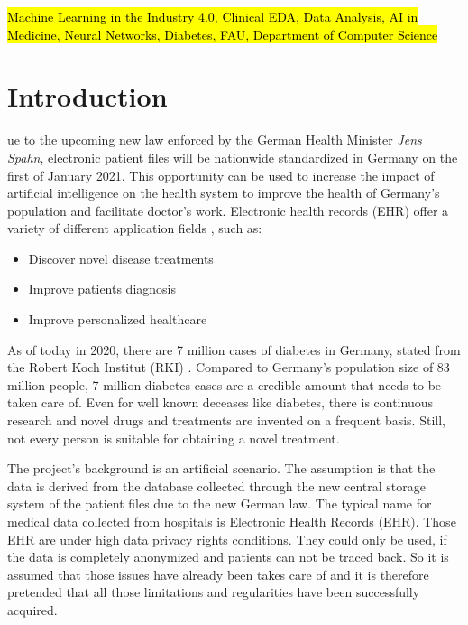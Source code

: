 \documentclass[journal]{IEEEtran}
\begin{document}
\begin{IEEEkeywords}
\hl{Machine Learning in the Industry 4.0, Clinical EDA, Data Analysis, AI in Medicine, Neural Networks, Diabetes, FAU, Department of Computer Science}
\end{IEEEkeywords}

\IEEEpeerreviewmaketitle

\section{Introduction}
ue to the upcoming new law enforced by the German Health Minister \textit{Jens Spahn}, electronic patient files will be nationwide standardized in Germany \cite{spahn} on the first of January 2021. This opportunity can be used to increase the impact of artificial intelligence on the health system to improve the health of Germany's population and facilitate doctor's work. Electronic health records (EHR) offer a variety of different application fields \cite{cite1} \cite{cite2}, such as: \\

\begin{itemize}
	\item Discover novel disease treatments
	\item Improve patients diagnosis
	\item Improve personalized healthcare \\
\end{itemize}

As of today in 2020, there are 7 million cases of diabetes in Germany, stated from the Robert Koch Institut (RKI) \cite{diab}. Compared to Germany's population size of 83 million people, 7 million diabetes cases are a credible amount that needs to be taken care of. Even for well known deceases like diabetes, there is continuous research and novel drugs and treatments are invented on a frequent basis. Still, not every person is suitable for obtaining a novel treatment. 

The project's background is an artificial scenario. The assumption is that the data is derived from the database collected through the new central storage system of the patient files due to the new German law. The typical name for medical data collected from hospitals is Electronic Health Records (EHR). Those EHR are under high data privacy rights conditions. They could only be used, if the data is completely anonymized and patients can not be traced back. So it is assumed that those issues have already been takes care of and it is therefore pretended that all those limitations and regularities have been successfully acquired.
\end{document}
